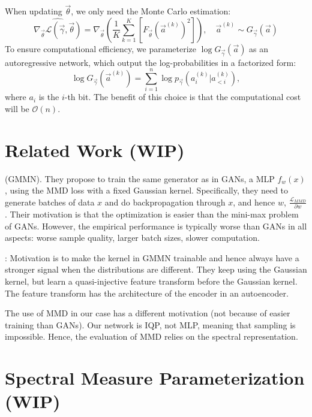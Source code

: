 \documentclass[a4paper,onecolumn,notitlepage,nofootinbib,longbibliography,superscriptaddress, floatfix, pra, aps, 10pt]{revtex4-2}
\begin{document}
When updating $\vec{\theta}$, we only need the Monte Carlo estimation:
\begin{equation}
\widehat{\nabla_{\vec{{\theta}}}\mathcal{L}(\vec\gamma, \vec\theta)} =\nabla_{\vec{\theta}} \left( \frac{1}{K}\sum_{k=1}^{K} \left[ F_{\vec{\theta}}(\vec{a}^{(k)})^2\right] \right), \quad \vec{a}^{(k)} \sim G_{\vec{\gamma}}(\vec{a})
\end{equation}
To ensure computational efficiency, we parameterize $\log G_{\vec{\gamma}}(\vec{a})$ as an autoregressive network, which output the log-probabilities in a factorized form: 
\begin{equation}
\log G_{\vec{\gamma}}(\vec{a}^{(k)}) = \sum_{i=1}^n \log p_{\vec{\gamma}}(a_i^{(k)} | a_{<i}^{(k)}),
\end{equation} where $a_i$ is the $i$-th bit. The benefit of this choice is that the computational cost will be $\mathcal{O}(n)$.

\section{Related Work (WIP)}
\cite{pmlr-v37-li15} (GMMN). They propose to train the same generator as in GANs, a MLP $f_w(x)$, using the MMD loss with a fixed Gaussian kernel. Specifically, they need to generate batches of data $x$ and do backpropagation through $x$, and hence $w$, $\frac{\mathcal{L}_{MMD}}{\partial w}$. Their motivation is that the optimization is easier than the mini-max problem of GANs. However, the empirical performance is typically worse than GANs in all aspects: worse sample quality, larger batch sizes, slower computation.

\cite{NIPS2017_dfd7468a}: Motivation is to make the kernel in GMMN trainable and hence always have a stronger signal when the distributions are different. They keep using the Gaussian kernel, but learn a quasi-injective feature transform before the Gaussian kernel. The feature transform has the architecture of the encoder in an autoencoder. 

\cite{pmlr-v89-li19f}

The use of MMD in our case has a different motivation (not because of easier training than GANs). Our network is IQP, not MLP, meaning that sampling is impossible. Hence, the evaluation of MMD relies on the spectral representation. 

\section{Spectral Measure Parameterization (WIP)}
\end{document}
